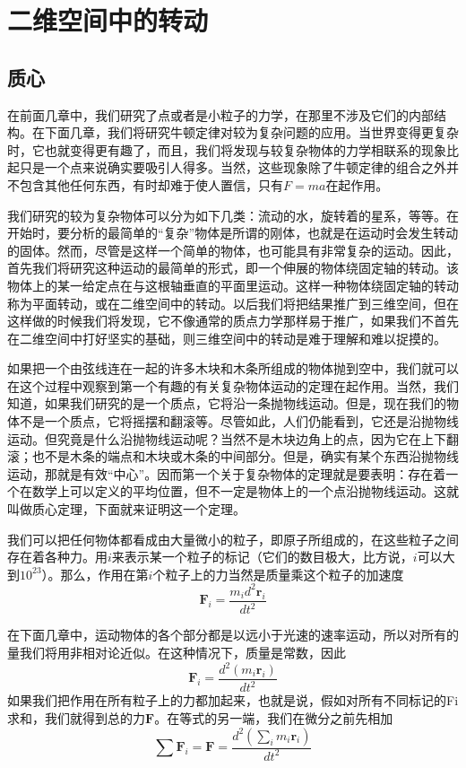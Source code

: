 \chapter{二维空间中的转动}

\section{质心}

在前面几章中，我们研究了点或者是小粒子的力学，在那里不涉及它们的内部结构。在下面几章，我们将研究牛顿定律对较为复杂问题的应用。当世界变得更复杂时，它也就变得更有趣了，而且，我们将发现与较复杂物体的力学相联系的现象比起只是一个点来说确实要吸引人得多。当然，这些现象除了牛顿定律的组合之外并不包含其他任何东西，有时却难于使人置信，只有$F=ma$在起作用。

我们研究的较为复杂物体可以分为如下几类：流动的水，旋转着的星系，等等。在开始时，要分析的最简单的“复杂”物体是所谓的刚体，也就是在运动时会发生转动的固体。然而，尽管是这样一个简单的物体，也可能具有非常复杂的运动。因此，首先我们将研究这种运动的最简单的形式，即一个伸展的物体绕固定轴的转动。该物体上的某一给定点在与这根轴垂直的平面里运动。这样一种物体绕固定轴的转动称为平面转动，或在二维空间中的转动。以后我们将把结果推广到三维空间，但在这样做的时候我们将发现，它不像通常的质点力学那样易于推广，如果我们不首先在二维空间中打好坚实的基础，则三维空间中的转动是难于理解和难以捉摸的。

如果把一个由弦线连在一起的许多木块和木条所组成的物体抛到空中，我们就可以在这个过程中观察到第一个有趣的有关复杂物体运动的定理在起作用。当然，我们知道，如果我们研究的是一个质点，它将沿一条抛物线运动。但是，现在我们的物体不是一个质点，它将摇摆和翻滚等。尽管如此，人们仍能看到，它还是沿抛物线运动。但究竟是什么沿抛物线运动呢？当然不是木块边角上的点，因为它在上下翻滚；也不是木条的端点和木块或木条的中间部分。但是，确实有某个东西沿抛物线运动，那就是有效“中心”。因而第一个关于复杂物体的定理就是要表明：存在着一个在数学上可以定义的平均位置，但不一定是物体上的一个点沿抛物线运动。这就叫做质心定理，下面就来证明这一个定理。

我们可以把任何物体都看成由大量微小的粒子，即原子所组成的，在这些粒子之间存在着各种力。用$i$来表示某一个粒子的标记（它们的数目极大，比方说，$i$可以大到$10^23$）。那么，作用在第$i$个粒子上的力当然是质量乘这个粒子的加速度
\begin{equation}
    \label{Eq:I:18:1}
    \boldsymbol{F}_i = \frac{m_id^2\boldsymbol{r}_i}{dt^2}
\end{equation}

在下面几章中，运动物体的各个部分都是以远小于光速的速率运动，所以对所有的量我们将用非相对论近似。在这种情况下，质量是常数，因此
\begin{equation}
    \label{Eq:I:18:2}
    \boldsymbol{F}_i = \frac{d^2(m_i\boldsymbol{r}_i)}{dt^2}
\end{equation}
如果我们把作用在所有粒子上的力都加起来，也就是说，假如对所有不同标记的Fi求和，我们就得到总的力$\boldsymbol{F}$。在等式的另一端，我们在微分之前先相加
\begin{equation}
    \label{Eq:I:18:3}
    \sum \boldsymbol{F}_i = \boldsymbol{F} = \frac{d^2(\sum\limits_{i} m_i\boldsymbol{r}_i)}{dt^2}
\end{equation}

